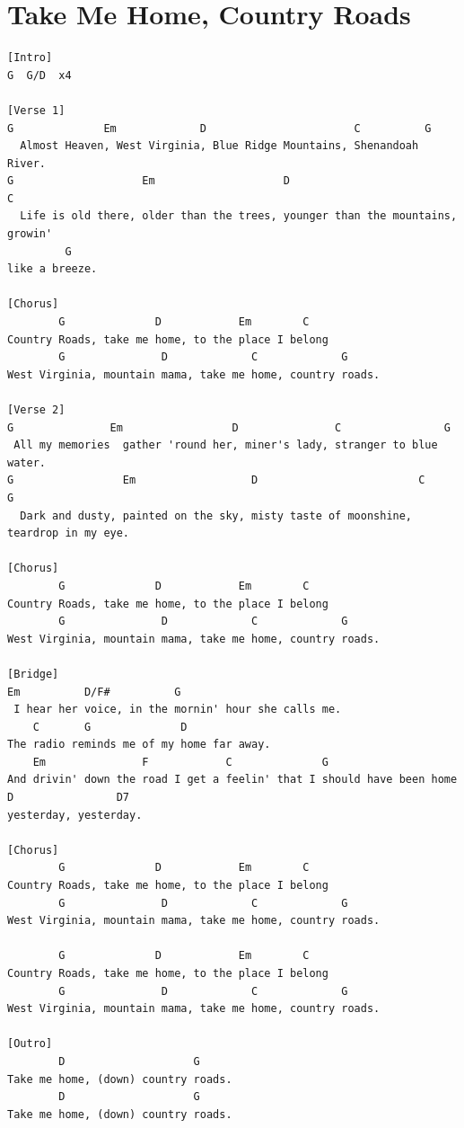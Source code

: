 \documentclass{article}
\begin{document}
\section{Take Me Home, Country Roads}
{\tiny
}

\begin{guitar}
\begin{verbatim}
[Intro]
G  G/D  x4
 
[Verse 1]
G              Em             D                       C          G
  Almost Heaven, West Virginia, Blue Ridge Mountains, Shenandoah River.
G                    Em                    D                           C
  Life is old there, older than the trees, younger than the mountains, growin' 
         G
like a breeze.
 
[Chorus]
        G              D            Em        C
Country Roads, take me home, to the place I belong
        G               D             C             G
West Virginia, mountain mama, take me home, country roads.
 
[Verse 2]
G               Em                 D               C                G
 All my memories  gather 'round her, miner's lady, stranger to blue water.
G                 Em                  D                         C              G
  Dark and dusty, painted on the sky, misty taste of moonshine, teardrop in my eye.
 
[Chorus]
        G              D            Em        C
Country Roads, take me home, to the place I belong
        G               D             C             G
West Virginia, mountain mama, take me home, country roads.
 
[Bridge]
Em          D/F#          G
 I hear her voice, in the mornin' hour she calls me.
    C       G              D
The radio reminds me of my home far away.
    Em               F            C              G
And drivin' down the road I get a feelin' that I should have been home 
D                D7
yesterday, yesterday.
 
[Chorus]
        G              D            Em        C
Country Roads, take me home, to the place I belong
        G               D             C             G
West Virginia, mountain mama, take me home, country roads.
 
        G              D            Em        C
Country Roads, take me home, to the place I belong
        G               D             C             G
West Virginia, mountain mama, take me home, country roads.
 
[Outro]
        D                    G
Take me home, (down) country roads.
        D                    G
Take me home, (down) country roads.
\end{verbatim}

\end{guitar}
\end{document}
